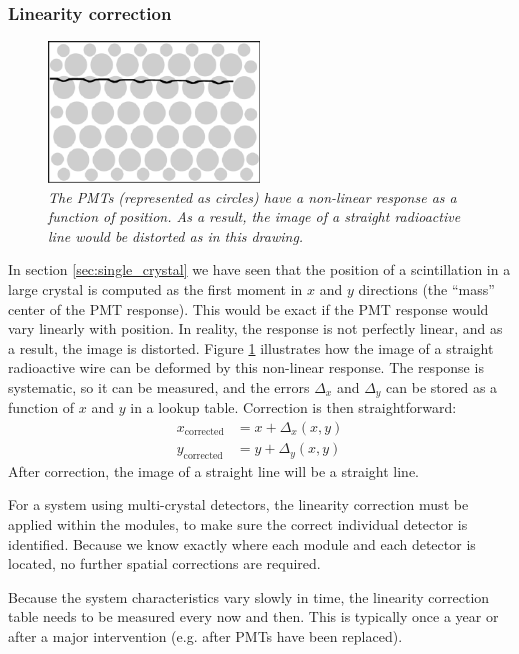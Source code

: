 \documentclass[11pt,oneside]{article}
\begin{document}
\subsubsection{Linearity correction}
\begin{figure}[tb]
\centering
\includegraphics[width=0.5\textwidth]{figs/fig_linearity.pdf}
\caption{\label{fig:linearity} \emph{The PMTs (represented as circles) have a
non-linear response as a function of position. As a result, the image of a
straight radioactive line would be distorted as in this drawing.}}
\end{figure}

In section \ref{sec:single_crystal} we have seen that the position of
a scintillation in a large crystal is computed as the first moment in
$x$ and $y$ directions (the ``mass'' center of the PMT response). This
would be exact if the PMT response would vary linearly with
position. In reality, the response is not perfectly linear, and as a
result, the image is distorted. Figure \ref{fig:linearity} illustrates
how the image of a straight radioactive wire can be deformed by this
non-linear response. The response is systematic, so it can be
measured, and the errors $\Delta_x$ and $\Delta_y$ can be stored as a
function of $x$ and $y$ in a lookup table. Correction is then
straightforward:
\begin{align}
 x_{\text{corrected}} &= x + \Delta_x(x,y) \nonumber \\
 y_{\text{corrected}} &= y + \Delta_y(x,y)
\end{align}
After correction, the image of a straight line will be a straight line.

For a system using multi-crystal detectors, the linearity correction must be
applied within the modules, to make sure the correct individual detector is
identified. Because we know exactly where each module and each detector is
located, no further spatial corrections are required.

Because the system characteristics vary slowly in time, the linearity
correction table needs to be measured every now and then. This is typically
once a year or after a major intervention (e.g. after PMTs have been
replaced).
\end{document}
